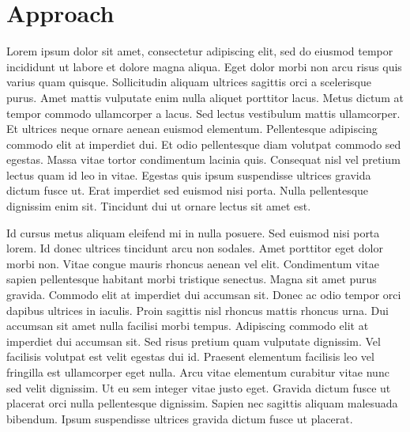 \documentclass[conference]{IEEEtran}
\begin{document}
\section{Approach}
Lorem ipsum dolor sit amet, consectetur adipiscing elit, sed do eiusmod tempor incididunt ut labore et dolore magna aliqua. Eget dolor morbi non arcu risus quis varius quam quisque. Sollicitudin aliquam ultrices sagittis orci a scelerisque purus. Amet mattis vulputate enim nulla aliquet porttitor lacus. Metus dictum at tempor commodo ullamcorper a lacus. Sed lectus vestibulum mattis ullamcorper. Et ultrices neque ornare aenean euismod elementum. Pellentesque adipiscing commodo elit at imperdiet dui. Et odio pellentesque diam volutpat commodo sed egestas. Massa vitae tortor condimentum lacinia quis. Consequat nisl vel pretium lectus quam id leo in vitae. Egestas quis ipsum suspendisse ultrices gravida dictum fusce ut. Erat imperdiet sed euismod nisi porta. Nulla pellentesque dignissim enim sit. Tincidunt dui ut ornare lectus sit amet est.

Id cursus metus aliquam eleifend mi in nulla posuere. Sed euismod nisi porta lorem. Id donec ultrices tincidunt arcu non sodales. Amet porttitor eget dolor morbi non. Vitae congue mauris rhoncus aenean vel elit. Condimentum vitae sapien pellentesque habitant morbi tristique senectus. Magna sit amet purus gravida. Commodo elit at imperdiet dui accumsan sit. Donec ac odio tempor orci dapibus ultrices in iaculis. Proin sagittis nisl rhoncus mattis rhoncus urna. Dui accumsan sit amet nulla facilisi morbi tempus. Adipiscing commodo elit at imperdiet dui accumsan sit. Sed risus pretium quam vulputate dignissim. Vel facilisis volutpat est velit egestas dui id. Praesent elementum facilisis leo vel fringilla est ullamcorper eget nulla. Arcu vitae elementum curabitur vitae nunc sed velit dignissim. Ut eu sem integer vitae justo eget. Gravida dictum fusce ut placerat orci nulla pellentesque dignissim. Sapien nec sagittis aliquam malesuada bibendum. Ipsum suspendisse ultrices gravida dictum fusce ut placerat.
\end{document}

